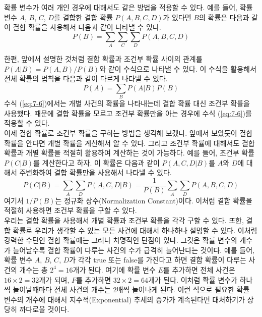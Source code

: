 \documentclass[a4paper]{oblivoir}
\begin{document}
확률 변수가 여러 개인 경우에 대해서도 같은 방법을 적용할 수 있다. 예를 들어, 확률 변수 $A$, $B$, $C$, $D$를 결합한 결합 확률 $P(A,B,C,D)$가 있다면 $B$의 확률은 다음과 같이 결합 확률을 사용해서 다음과 같이 나타낼 수 있다. 
\begin{equation}
P(B) = \sum_{A} \sum_{C} \sum_{D} P(A,B,C,D)
\label{eq:7-5}
\end{equation}

한편, 앞에서 설명한 것처럼 결합 확률과 조건부 확률 사이의 관계를 $P(A|B)=P(A,B)/P(B)$와 같이 수식으로 나타낼 수 있다. 이 수식을 활용해서 전체 확률의 법칙을 다음과 같이 다르게 나타낼 수 있다. 
\begin{equation}
P(A) = \sum_{B} P(A|B)P(B)
\label{eq:7-6}
\end{equation}
\noindent 수식 (\ref{eq:7-6})에서는 개별 사건의 확률을 나타내는데 결합 확률 대신 조건부 확률을 사용했다. 때문에 결합 확률을 모르고 조건부 확률만을 아는 경우에 수식 (\ref{eq:7-6})를 적용할 수 있다. \\

이제 결합 확률로 조건부 확률을 구하는 방법을 생각해 보겠다. 앞에서 보았듯이 결합 확률을 안다면 개별 확률을 계산해서 알 수 있다. 그리고 조건부 확률에 대해서도 결합 확률과 개별 확률을 적절히 활용하여 계산하는 것이 가능하다. 예를 들어, 조건부 확률 $P(C|B)$를 계산한다고 하자. 이 확률은 다음과 같이 $P(A,C,D|B)$를 $A$와 $D$에 대해서 주변화하여 결합 확률만을 사용해서 나타낼 수 있다.   
\begin{equation}
P(C|B) = \sum_{A} \sum_{D} P(A,C,D|B) = \frac{1}{P(B)} \sum_{A} \sum_{D} P(A,B,C,D) 
\label{eq:7-7}
\end{equation}
\noindent 여기서 $1/P(B)$는 정규화 상수(Normalization Constant)이다. 이처럼 결합 확률을 적절히 사용하면 조건부 확률을 구할 수 있다. \\

우리는 결합 확률을 사용해서 개별 확률과 조건부 확률을 각각 구할 수 있다. 또한, 결합 확률로 우리가 생각할 수 있는 모든 사건에 대해서 하나하나 설명할 수 있다. 이처럼 강력한 수단인 결합 확률에는 그러나 치명적인 단점이 있다. 그것은 확률 변수의 개수가 늘어날수록 결합 확률이 다루는 사건의 수가 급격히 늘어난다는 것이다. 예를 들어, 확률 변수 $A$, $B$, $C$, $D$가 각각 true 또는 false를 가진다고 하면 결합 확률이 다루는 사건의 개수는 총 $2^4=16$개가 된다. 여기에 확률 변수 $E$를 추가하면 전체 사건은 $16 \times 2 = 32$개가 되며, $F$를 추가하면 $32 \times 2 = 64$개가 된다. 이처럼 확률 변수가 하나씩 늘어날때마다 전체 사건의 개수는 2배씩 늘어나게 된다. 이런 식으로 필요한 확률 변수의 개수에 대해서 지수적(Exponential) 추세의 증가가 계속된다면 대처하기가 상당히 까다로울 것이다. \\
\end{document}
